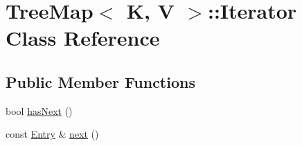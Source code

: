 \hypertarget{class_tree_map_1_1_iterator}{\section{Tree\-Map$<$ K, V $>$\-:\-:Iterator Class Reference}
\label{class_tree_map_1_1_iterator}
}
\subsection*{Public Member Functions}
\begin{DoxyCompactItemize}
\item 
bool \hyperlink{class_tree_map_1_1_iterator_a7ef8420006629ecfd31ba122dc7f3f79}{has\-Next} ()
\item 
const \hyperlink{class_tree_map_1_1_entry}{Entry} \& \hyperlink{class_tree_map_1_1_iterator_ae5fee5c134c0c41163cc3f743d2b1d6b}{next} ()
\end{DoxyCompactItemize}


